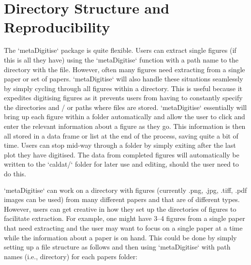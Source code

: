 \documentclass{article}
\begin{document}




\section{Directory Structure and Reproducibility}

The `metaDigitise` package is quite flexible. Users can extract single figures (if this is all they have) using the `metaDigitise` function with a path name to the directory with the file. However, often many figures need extracting from a single paper or set of papers. `metaDigitise` will also handle these situations seamlessly by simply cycling through all figures within a directory. This is useful because it expedites digitising figures as it prevents users from having to constantly specify the directories and / or paths where files are stored. `metaDigitise` essentially will bring up each figure within a folder automatically and allow the user to click and enter the relevant information about a figure as they go. This information is then all stored in a data frame or list at the end of the process, saving quite a bit of time. Users can stop mid-way through a folder by simply exiting after the last plot they have digitised.  The data from completed figures will automatically be written to the `caldat/` folder for later use and editing, should the user need to do this.

`metaDigitise` can work on a directory with figures (currently .png, .jpg, .tiff, .pdf images can be used) from many different papers and that are of different types. However, users can get creative in how they set up the directories of figures to facilitate extraction. For example, one might have 3–4 figures from a single paper that need extracting and the user may want to focus on a single paper at a time while the information about a paper is on hand. This could be done by simply setting up a file structure as follows and then using `metaDigitise` with path names (i.e., directory) for each papers folder:
\end{document}
